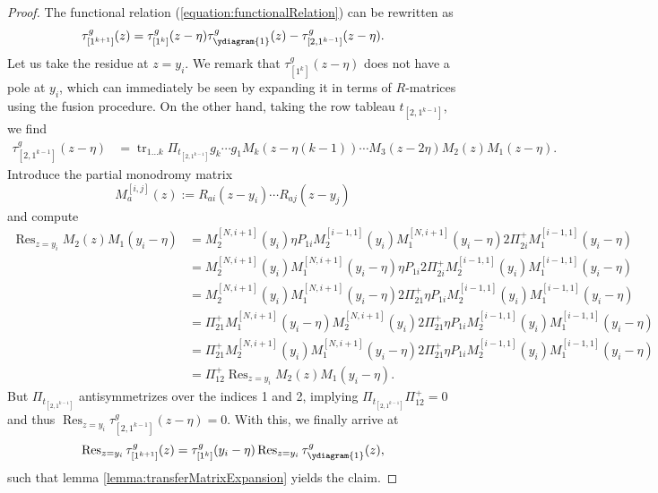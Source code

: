\documentclass[11pt]{report}
\theoremstyle{definition}
\theoremstyle{remark}
\theoremstyle{remark}
\begin{document}
\begin{proof}
The functional relation (\ref{equation:functionalRelation}) can be rewritten as
\begin{equation*}
\tau_{[1^{k+1}]}^g(z) = \tau_{[1^k]}^g(z-\eta) \tau_{\ydiagram{1}}^g(z) - \tau_{[2,1^{k-1}]}^g(z-\eta).
\end{equation*}
Let us take the residue at $z=y_i$. We remark that $\tau_{[1^k]}^g(z-\eta)$ does not have a pole at $y_i$, which can immediately be seen by expanding it in terms of $R$-matrices using the fusion procedure. On the other hand, taking the row tableau $t_{[2,1^{k-1}]}$, we find
\begin{align*}
\tau_{[2,1^{k-1}]}^g(z-\eta)
&= \operatorname{tr}_{1...k} \Pi_{t_{[2,1^{k-1}]}} g_k \cdots g_1 M_k(z-\eta(k-1)) \cdots M_3(z-2\eta) M_2(z) M_1(z-\eta).
\end{align*}
Introduce the partial monodromy matrix
\begin{equation*}
M_a^{[i,j]}(z) := R_{ai}(z-y_i) \cdots R_{aj}(z-y_j)
\end{equation*}
and compute
\begin{align*}
\operatorname{Res}_{z=y_i} M_2(z) M_1(y_i-\eta)
&= M_2^{[N,i+1]}(y_i) \eta P_{1i} M_2^{[i-1,1]}(y_i) M_1^{[N,i+1]}(y_i-\eta) 2 \Pi_{2i}^+ M_1^{[i-1,1]}(y_i-\eta) \\
&= M_2^{[N,i+1]}(y_i) M_1^{[N,i+1]}(y_i-\eta) \eta P_{1i} 2 \Pi_{2i}^+ M_2^{[i-1,1]}(y_i) M_1^{[i-1,1]}(y_i-\eta) \\
&= M_2^{[N,i+1]}(y_i) M_1^{[N,i+1]}(y_i-\eta) 2 \Pi_{21}^+ \eta P_{1i} M_2^{[i-1,1]}(y_i) M_1^{[i-1,1]}(y_i-\eta) \\
&= \Pi_{21}^+ M_1^{[N,i+1]}(y_i-\eta) M_2^{[N,i+1]}(y_i) 2 \Pi_{21}^+ \eta P_{1i} M_2^{[i-1,1]}(y_i) M_1^{[i-1,1]}(y_i-\eta) \\
&= \Pi_{21}^+ M_2^{[N,i+1]}(y_i) M_1^{[N,i+1]}(y_i-\eta) 2 \Pi_{21}^+ \eta P_{1i} M_2^{[i-1,1]}(y_i) M_1^{[i-1,1]}(y_i-\eta) \\
&= \Pi_{12}^+ \operatorname{Res}_{z=y_i} M_2(z) M_1(y_i-\eta).
\end{align*}
But $\Pi_{t_{[2,1^{k-1}]}}$ antisymmetrizes over the indices 1 and 2, implying $\Pi_{t_{[2,1^{k-1}]}} \Pi_{12}^+ = 0$ and thus $\operatorname{Res}_{z=y_i} \tau_{[2,1^{k-1}]}^g(z-\eta) = 0$. With this, we finally arrive at
\begin{equation*}
\operatorname{Res}_{z=y_i} \tau_{[1^{k+1}]}^g(z)
= \tau_{[1^k]}^g(y_i-\eta) \operatorname{Res}_{z=y_i} \tau_{\ydiagram{1}}^g(z),
\end{equation*}
such that lemma \ref{lemma:transferMatrixExpansion} yields the claim.
\end{proof}
\end{document}
